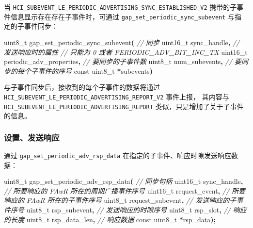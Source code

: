 \documentclass[
  12pt,
]{book}
\newenvironment{Shaded}{\begin{snugshade}}{\end{snugshade}}
\newcommand{\CommentTok}[1]{\textcolor[rgb]{0.56,0.35,0.01}{\textit{#1}}}
\newcommand{\DataTypeTok}[1]{\textcolor[rgb]{0.13,0.29,0.53}{#1}}
\newcommand{\NormalTok}[1]{#1}
\newcommand{\OperatorTok}[1]{\textcolor[rgb]{0.81,0.36,0.00}{\textbf{#1}}}
\begin{document}
当 \texttt{HCI\_SUBEVENT\_LE\_PERIODIC\_ADVERTISING\_SYNC\_ESTABLISHED\_V2} 携带的子事件信息显示存在存在子事件时，可通过
\texttt{gap\_set\_periodic\_sync\_subevent} 与指定的子事件同步：

\begin{Shaded}
\begin{Highlighting}[]
\DataTypeTok{uint8\_t}\NormalTok{ gap\_set\_periodic\_sync\_subevent}\OperatorTok{(}
  \CommentTok{// 同步}
  \DataTypeTok{uint16\_t}\NormalTok{ sync\_handle}\OperatorTok{,}
  \CommentTok{// 发送响应时的属性}
  \CommentTok{// 只能为 0 或者 PERIODIC\_ADV\_BIT\_INC\_TX}
  \DataTypeTok{uint16\_t}\NormalTok{ periodic\_adv\_properties}\OperatorTok{,}
  \CommentTok{// 要同步的子事件数}
  \DataTypeTok{uint8\_t}\NormalTok{ num\_subevents}\OperatorTok{,}
  \CommentTok{// 要同步的每个子事件的序号}
  \DataTypeTok{const} \DataTypeTok{uint8\_t} \OperatorTok{*}\NormalTok{subevents}\OperatorTok{)}
\end{Highlighting}
\end{Shaded}

与子事件同步后，接收到的每个子事件的数据将通过 \texttt{HCI\_SUBEVENT\_LE\_PERIODIC\_ADVERTISING\_REPORT\_V2} 事件上报，
其内容与 \texttt{HCI\_SUBEVENT\_LE\_PERIODIC\_ADVERTISING\_REPORT} 类似，只是增加了关于子事件的信息。

\hypertarget{ux8bbeux7f6eux53d1ux9001ux54cdux5e94}{%
\subsubsection{设置、发送响应}\label{ux8bbeux7f6eux53d1ux9001ux54cdux5e94}}

通过 \texttt{gap\_set\_periodic\_adv\_rsp\_data} 在指定的子事件、响应时隙发送响应数据：

\begin{Shaded}
\begin{Highlighting}[]
\DataTypeTok{uint8\_t}\NormalTok{ gap\_set\_periodic\_adv\_rsp\_data}\OperatorTok{(}
  \CommentTok{// 同步句柄}
  \DataTypeTok{uint16\_t}\NormalTok{ sync\_handle}\OperatorTok{,}
  \CommentTok{// 所要响应的 PAwR 所在的周期广播事件序号}
  \DataTypeTok{uint16\_t}\NormalTok{ request\_event}\OperatorTok{,}
  \CommentTok{// 所要响应的 PAwR 所在的子事件序号}
  \DataTypeTok{uint8\_t}\NormalTok{ request\_subevent}\OperatorTok{,}
  \CommentTok{// 发送响应的子事件序号}
  \DataTypeTok{uint8\_t}\NormalTok{ rsp\_subevent}\OperatorTok{,}
  \CommentTok{// 发送响应的时隙序号}
  \DataTypeTok{uint8\_t}\NormalTok{ rsp\_slot}\OperatorTok{,}
  \CommentTok{// 响应的长度}
  \DataTypeTok{uint8\_t}\NormalTok{ rsp\_data\_len}\OperatorTok{,}
  \CommentTok{// 响应数据}
  \DataTypeTok{const} \DataTypeTok{uint8\_t} \OperatorTok{*}\NormalTok{rsp\_data}\OperatorTok{);}
\end{Highlighting}
\end{Shaded}
\end{document}

